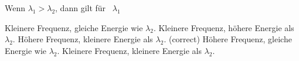 \documentclass[11pt]{exam}
\begin{document}
\begin{questions}
\vspace{3mm}\question Wenn \( \lambda_1 > \lambda_2 \), dann gilt für  \( \lambda_1 \)

\begin{choices}
	\choice Kleinere Frequenz, gleiche Energie wie \( \lambda_2 \).
	\choice Kleinere Frequenz, höhere Energie als \( \lambda_2 \).
	\choice Höhere Frequenz, kleinere Energie als \( \lambda_2 \). (correct)
	\choice Höhere Frequenz, gleiche Energie wie \( \lambda_2 \).
	\choice Kleinere Frequenz, kleinere Energie als \( \lambda_2 \).
\end{choices}

\vspace{3mm}\end{questions}
\end{document}
